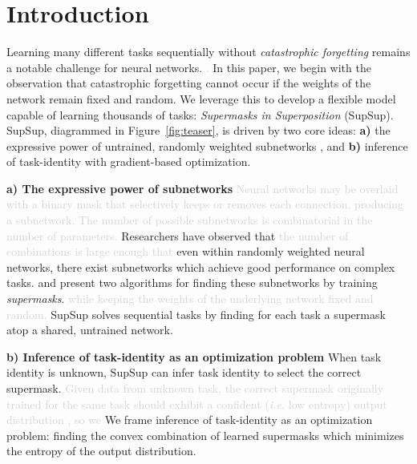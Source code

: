 \documentclass{article}
\newcommand{\ac}{SupSup\xspace}
\newcommand{\comments}[1]{#1}
\newcommand{\comments}[1]{}
\newcommand{\removed}[1]{\comments{\textcolor{lightgray}{#1}}}
\newcommand{\figref}[1]{Figure~\ref{fig:#1}}
\begin{document}
\section{Introduction}

Learning many different tasks sequentially without \emph{catastrophic forgetting} \cite{mccloskey1989catastrophic,french1999catastrophic, goodfellow2013empirical} remains a notable challenge for neural networks. \removed{\cite{thrun1998lifelong, zhao1996incremental, kirkpatrick2017overcoming}.}
In this paper, we begin with the observation that catastrophic forgetting cannot occur if the weights of the network remain fixed and random. We leverage this to develop a flexible model capable of learning thousands of tasks: \textit{Supermasks in Superposition} (\ac). \ac, diagrammed in \figref{teaser}, is driven by two core ideas: \textbf{a)} the expressive power of untrained, randomly weighted subnetworks \cite{zhou2019deconstructing, ramanujan2019s}, and \textbf{b)} inference of task-identity with gradient-based optimization.

\textbf{a) The expressive power of subnetworks}
\removed{Neural networks may be overlaid with a binary mask that selectively keeps or removes each connection, producing a subnetwork.
The number of possible subnetworks is combinatorial in the number of parameters.} Researchers have observed that \removed{the number of combinations is large enough 
that }even within randomly weighted neural networks, there exist subnetworks which achieve good performance on complex tasks. \citet{zhou2019deconstructing} and \citet{ramanujan2019s} present two algorithms for finding these subnetworks by training \emph{supermasks}. \removed{while keeping the weights of the underlying network fixed and random.}
SupSup solves sequential tasks by finding for each task a supermask atop a shared, untrained network.


\textbf{b) Inference of task-identity as an optimization problem}
When task identity is unknown, $\text{\ac}$ can infer task identity to select the correct supermask.
\removed{Given data from unknown task, the correct supermask originally trained for the same task should exhibit a confident (\textit{i.e.} low entropy) output distribution \cite{hendrycks2016baseline}, so we} We frame inference of task-identity as an optimization problem: finding the convex combination of learned supermasks which minimizes the entropy of the output distribution.
\end{document}
